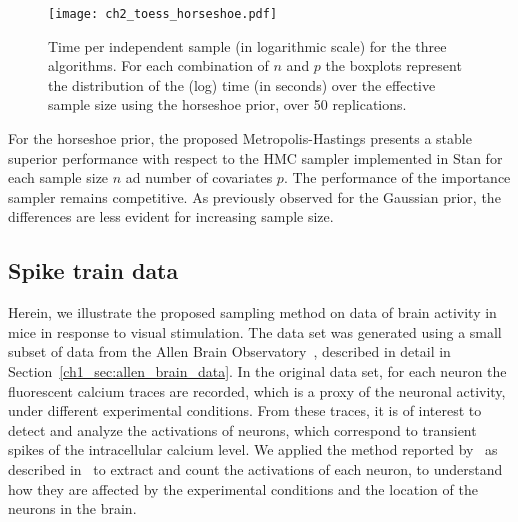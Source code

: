 \begin{figure}[h!]
	\begin{center}
		\texttt{[image: ch2\_toess\_horseshoe.pdf]}
		\caption[Comparison between the time per independent sample of the proposed algorithms and of the HMC algorithm, using a horseshoe prior.]{Time per independent sample (in logarithmic scale) for the three algorithms. For each combination of $n$ and $p$ the boxplots represent the distribution of the (log) time (in seconds) over the effective sample size using the horseshoe prior, over 50 replications.
			\label{fig:time_ess_horseshoe}}
	\end{center}
\end{figure}
%
For the horseshoe prior, the proposed Metropolis-Hastings presents a stable superior performance with respect to the HMC sampler implemented in Stan for each sample size $n$ ad number of covariates $p$. The performance of the importance sampler remains competitive. As previously observed for the Gaussian prior, the differences are less evident for increasing sample size. 





\subsection{Spike train data}
\label{ch2_sec:application}
%
Herein, we illustrate the proposed sampling method on data of brain activity in mice in response to visual stimulation.
The data set was generated using a small subset of data from the Allen Brain Observatory~\parencite{allen}, described in detail in Section~\ref{ch1_sec:allen_brain_data}.
In the original data set, for each neuron the fluorescent calcium traces are recorded, which is a proxy of the neuronal activity, under different experimental conditions. From these traces, it is of interest to detect and analyze the activations of neurons, which correspond to transient spikes of the intracellular calcium level. 
We applied the method reported by~\textcite{jewell2019} as described in~\textcite{vries2020} to extract and count the activations of each neuron, to understand how they are affected by the experimental conditions and the location of the neurons in the brain. 

